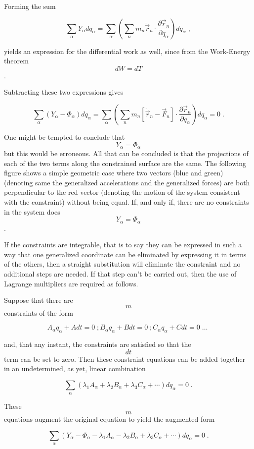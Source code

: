 \documentclass[12pt]{article}
\begin{document}
Forming the sum

\[ \sum_{\alpha} Y_{\alpha} dq_{\alpha} = \sum_{\alpha} \left( \sum_n m_n {\ddot {\vec r}}_n \cdot \frac{\partial {\vec r}_n}{\partial q_\alpha} \right) dq_\alpha \; ,\]

yields an expression for the differential work as well, since from the Work-Energy theorem $$dW = dT$$.

Subtracting these two expressions gives 

\[ \sum_{\alpha} \left( Y_{\alpha} - \Phi_{\alpha} \right) dq_\alpha = \sum_{\alpha} \left( \sum_n m_n \left[ {\ddot {\vec r}}_n - {\vec F}_n \right] \cdot \frac{\partial {\vec r}_n}{\partial q_\alpha} \right) dq_\alpha = 0 \; .\]

One might be tempted to conclude that $$Y_\alpha = \Phi_\alpha$$ but this would be erroneous.  All that can be concluded is that the projections of each of the two terms along the constrained surface are the same.  The following figure shows a simple geometric case where two vectors (blue and green) (denoting same the generalized accelerations and the generalized forces) are both perpendicular to the red vector (denoting the motion of the system consistent with the constraint) without being equal.  If, and only if, there are no constraints in the system does $$Y_\alpha = \Phi_\alpha$$.

If the constraints are integrable, that is to say they can be expressed in such a way that one generalized coordinate can be eliminated by expressing it in terms of the others, then a straight substitution will eliminate the constraint and no additional steps are needed.  If that step can't be carried out, then the use of Lagrange multipliers are required as follows.

Suppose that there are $$m$$ constraints of the form

\[ A_\alpha q_\alpha + A dt = 0 \; ;  B_\alpha q_\alpha + B dt = 0 \; ;  C_\alpha q_\alpha + C dt = 0 \; \ldots \; \]

and, that any instant, the constraints are satisfied so that the $$dt$$ term can be set to zero.  Then these constraint equations can be added together in an undetermined, as yet, linear combination

\[ \sum_\alpha ( \lambda_1 A_\alpha + \lambda_2 B_\alpha + \lambda_3 C_\alpha + \cdots ) dq_\alpha = 0 \; .\] 

These $$m$$ equations augment the original equation to yield the augmented form

\[ \sum_{\alpha} (Y_\alpha - \Phi_\alpha - \lambda_1 A_\alpha - \lambda_2 B_\alpha + \lambda_3 C_\alpha + \cdots ) dq_\alpha = 0 \; .\]
\end{document}
